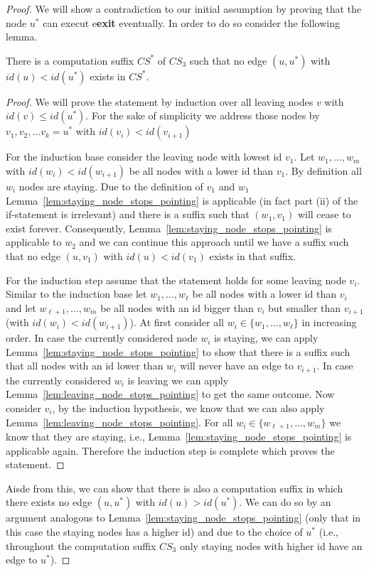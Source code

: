 \documentclass[a4paper,USenglish]{lipics}
\begin{document}
\begin{proof}
We will show a contradiction to our initial assumption by proving that the node $u^*$ can execut e\textbf{exit} eventually. In order to do so consider the following lemma.

\begin{lemma}
There is a computation suffix $CS^*$ of $CS_3$ such that no edge $(u,u^*)$ with $id(u)<id(u^*)$ exists in $CS^*$.
\end{lemma}

\begin{proof}
We will prove the statement by induction over all leaving nodes $v$ with $id(v) \leq id(u^*)$.
For the sake of simplicity we address those nodes by $v_1, v_2, \ldots v_k =u^*$ with $id(v_i)<id(v_{i+1})$

For the induction base consider the leaving node with lowest id $v_1$.
Let $w_1, \ldots,w_m$ with $id(w_i)<id(w_{i+1})$ be all nodes with a lower id than $v_1$.
By definition all $w_i$ nodes are staying.
Due to the definition of $v_1$ and $w_1$ Lemma~\ref{lem:staying_node_stops_pointing} is applicable (in fact part (ii) of the if-statement is irrelevant) and there is a suffix such that $(w_1,v_1)$ will cease to exist forever.
Consequently, Lemma~\ref{lem:staying_node_stops_pointing} is applicable to $w_2$ and we can continue this approach until we have a suffix such that no edge $(u,v_1)$ with $id(u)<id(v_1)$ exists in that suffix.

For the induction step assume that the statement holds for some leaving node $v_i$.
Similar to the induction base let $w_1, \ldots,w_\ell$  be all nodes with a lower id than $v_i$ and let $w_{\ell+1}, \ldots,w_m$ be all nodes with an id bigger than $v_i$ but smaller than $v_{i+1}$ (with $id(w_i)<id(w_{i+1})$).
At first consider all $w_i \in \{w_1, \ldots,w_\ell \}$ in increasing order. 
In case the currently considered node $w_i$ is staying, we can apply Lemma~\ref{lem:staying_node_stops_pointing} to show that there is a suffix such that all nodes with an id lower than $w_i$ will never have an edge to $v_{i+1}$.
In case the currently considered $w_i$ is leaving we can apply Lemma~\ref{lem:leaving_node_stops_pointing} to get the same outcome.
Now consider $v_i$, by the induction hypothesis, we know that we can also apply Lemma~\ref{lem:leaving_node_stops_pointing}.
For all $w_i \in \{w_{\ell+1}, \ldots,w_m \}$ we know that they are staying, i.e., Lemma~\ref{lem:staying_node_stops_pointing} is applicable again.
Therefore the induction step is complete which proves the statement.
\end{proof}
Aisde from this, we can show that there is also a computation suffix in which there exists no edge $(u,u^*)$ with $id(u)>id(u^*)$.
We can do so by an argument analogous to Lemma~\ref{lem:staying_node_stops_pointing} (only that in this case the staying nodes has a higher id) and due to the choice of $u^*$ (i.e., throughout the computation suffix $CS_3$ only staying nodes with higher id have an edge to $u^*$).


\end{proof}
\end{document}
